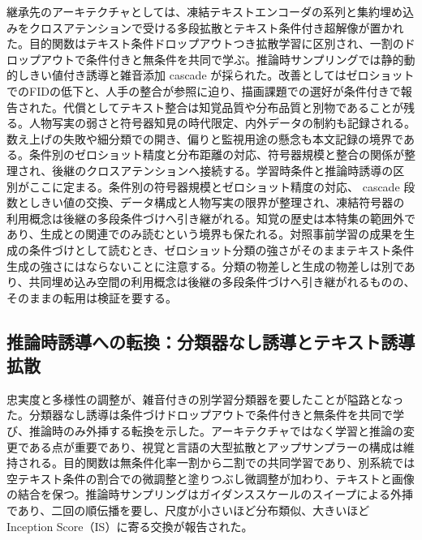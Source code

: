 \documentclass[lualatex,a4paper,10pt]{jlreq}
\begin{document}
継承先のアーキテクチャとしては、凍結テキストエンコーダの系列と集約埋め込みをクロスアテンションで受ける多段拡散とテキスト条件付き超解像が置かれた\autocite{btd011}。目的関数はテキスト条件ドロップアウトつき拡散学習に区別され、一割のドロップアウトで条件付きと無条件を共同で学ぶ\autocite{btd011}。推論時サンプリングでは静的動的しきい値付き誘導と雑音添加 cascade が採られた\autocite{btd011}。改善としてはゼロショットでのFIDの低下と、人手の整合が参照に迫り、描画課題での選好が条件付きで報告された\autocite{btd011,btd031}。代償としてテキスト整合は知覚品質や分布品質と別物であることが残る。人物写実の弱さと符号器知見の時代限定、内外データの制約も記録される\autocite{btd011}。数え上げの失敗や細分類での開き、偏りと監視用途の懸念も本文記録の境界である\autocite{btd031}。条件別のゼロショット精度と分布距離の対応、符号器規模と整合の関係が整理され、後継のクロスアテンションへ接続する。学習時条件と推論時誘導の区別がここに定まる。条件別の符号器規模とゼロショット精度の対応、 cascade 段数としきい値の交換、データ構成と人物写実の限界が整理され、凍結符号器の利用概念は後継の多段条件づけへ引き継がれる\autocite{btd011}。知覚の歴史は本特集の範囲外であり、生成との関連でのみ読むという境界も保たれる\autocite{btd031}。対照事前学習の成果を生成の条件づけとして読むとき、ゼロショット分類の強さがそのままテキスト条件生成の強さにはならないことに注意する。分類の物差しと生成の物差しは別であり、共同埋め込み空間の利用概念は後継の多段条件づけへ引き継がれるものの、そのままの転用は検証を要する\autocite{btd011,btd031}。

\subsection{推論時誘導への転換：分類器なし誘導とテキスト誘導拡散}
忠実度と多様性の調整が、雑音付きの別学習分類器を要したことが隘路となった。分類器なし誘導は条件づけドロップアウトで条件付きと無条件を共同で学び、推論時のみ外挿する転換を示した\autocite{btd032}。アーキテクチャではなく学習と推論の変更である点が重要であり、視覚と言語の大型拡散とアップサンプラーの構成は維持される\autocite{btd032}。目的関数は無条件化率一割から二割での共同学習であり、別系統では空テキスト条件の割合での微調整と塗りつぶし微調整が加わり、テキストと画像の結合を保つ\autocite{btd032,btd033}。推論時サンプリングはガイダンススケールのスイープによる外挿であり、二回の順伝播を要し、尺度が小さいほど分布類似、大きいほどInception Score（IS）に寄る交換が報告された\autocite{btd032}。
\end{document}
